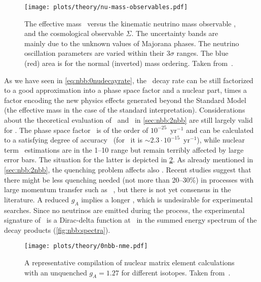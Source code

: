 \begin{figure}
  \centering
  \texttt{[image: plots/theory/nu-mass-observables.pdf]}
  \caption{%
    The effective mass \mbb\ versus the kinematic neutrino mass observable \mb, and the
    cosmological observable $\Sigma$. The uncertainty bands are mainly due to the unknown
    values of Majorana phases. The neutrino oscillation parameters are varied within their
    $3\sigma$ ranges. The blue (red) area is for the normal (inverted) mass ordering.
    Taken from~\cite{Dolinski2019}.
  }\label{fig:nbb:mass-obs}
\end{figure}

As we have seen in \cref{eq:nbb:0nudecayrate}, the \onbb\ decay rate can be still
factorized to a good approximation into a phase space factor and a nuclear part, times a
factor encoding the new physics effects generated beyond the Standard Model (the effective
mass in the case of the standard interpretation). Considerations about the theoretical
evaluation of \psft\ and \nmet\ in \cref{sec:nbb:2nbb} are still largely valid for \onbb.
The phase space factor \psfz\ is of the order of $10^{-25}$~yr$^{-1}$ and can be
calculated to a satisfying degree of accuracy~\cite{Kotila2012, Stoica2013} (for \gesix\
it is ${\sim}2.3 \cdot 10^{-15}$~yr$^{-1}$), while nuclear term \nmez\ estimations are in
the 1--10 range but remain terribly affected by large error bars. The situation for the
latter is depicted in \cref{fig:nbb:nme}. As already mentioned in \cref{sec:nbb:2nbb}, the
quenching problem affects also \onbb. Recent studies suggest that there might be less
quenching needed (not more than 20--30\%) in processes with large momentum transfer such
as \onbb~\cite{?}, but there is not yet consensus in the literature. A reduced $g_A$
implies a longer \thalfzero, which is undesirable for experimental searches.  Since no
neutrinos are emitted during the process, the experimental signature of \onbb\ is a
Dirac-delta function at \qbb\ in the summed energy spectrum of the decay products
(\cref{fig:nbb:spectra}).

\begin{figure}
  \centering
  \texttt{[image: plots/theory/0nbb-nme.pdf]}
  \caption{%
    A representative compilation of nuclear matrix element calculations with an unquenched
    $g_A=1.27$ for different isotopes. Taken from~\cite{Yao2020}.
  }\label{fig:nbb:nme}
\end{figure}


